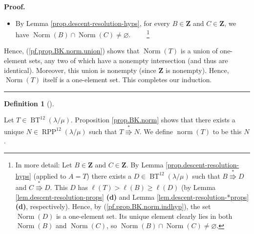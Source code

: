 \documentclass[numbers=enddot,12pt,final,onecolumn,notitlepage]{scrartcl}%
\theoremstyle{definition}
\newtheorem{defi}[theo]{Definition}
\newenvironment{definition}[1][]
{\begin{defi}[#1]\begin{leftbar}}
{\end{leftbar}\end{defi}}
\newenvironment{proof}[1][Proof]{\noindent\textbf{#1.} }{\ \rule{0.5em}{0.5em}}
\def\OneTwoRPP{{\operatorname{RPP}^{12}\left(  \lambda/\mu\right)}}
\def\BenignTables{{\operatorname{BT}^{12}\left(  \lambda/\mu\right)}}
\begin{document}
\begin{proof}
\begin{itemize}
\item By Lemma \ref{prop.descent-resolution-hyps}, for every
$B\in\mathbf{Z}$ and $C\in\mathbf{Z}$, we have
$\operatorname*{Norm}\left(  B\right)  \cap\operatorname*{Norm}\left(
C\right)  \neq\varnothing$. 
\ \ \ \ \footnote{In more detail:
Let $B\in\mathbf{Z}$ and $C\in\mathbf{Z}$.
By Lemma \ref{prop.descent-resolution-hyps} (applied to $A=T$)
there exists
a $D\in\BenignTables$ such that $B\overset{\ast}{\Rrightarrow}D$ and
$C\overset{\ast}{\Rrightarrow}D$. This $D$ has
$\ell\left( T\right)  >\ell\left(  B\right)
\geq\ell\left(  D\right)  $ (by Lemma \ref{lem.descent-resolution-props}
\textbf{(d)} and
Lemma \ref{lem.descent-resolution-*props} \textbf{(d)}, respectively).
Hence, by (\ref{pf.prop.BK.norm.indhyp}), the set
$\operatorname*{Norm}\left(  D\right)  $ is a one-element set. Its unique element
clearly lies in both $\operatorname*{Norm}\left(  B\right)  $ and
$\operatorname*{Norm}\left(  C\right)  $, so
$\operatorname*{Norm}\left(
B\right)  \cap\operatorname*{Norm}\left(  C\right)  \neq\varnothing$.

}

\end{itemize}

Hence, (\ref{pf.prop.BK.norm.union}) shows that $\operatorname*{Norm}\left(
T\right)  $ is a union of one-element sets, any two of which have a nonempty
intersection (and thus are identical).
Moreover, this union is nonempty (since $\mathbf{Z}$ is nonempty). Hence,
$\operatorname*{Norm}\left(  T\right)  $ itself is a one-element set. This
completes our induction.
\end{proof}

\begin{definition}
Let $T\in\BenignTables$. Proposition \ref{prop.BK.norm} shows that there exists a
unique $N\in\OneTwoRPP$ such that $T\overset{\ast}{\Rrightarrow}N$. We define
$\operatorname*{norm}\left(  T\right)  $ to be this $N$.
\end{definition}
\end{document}
